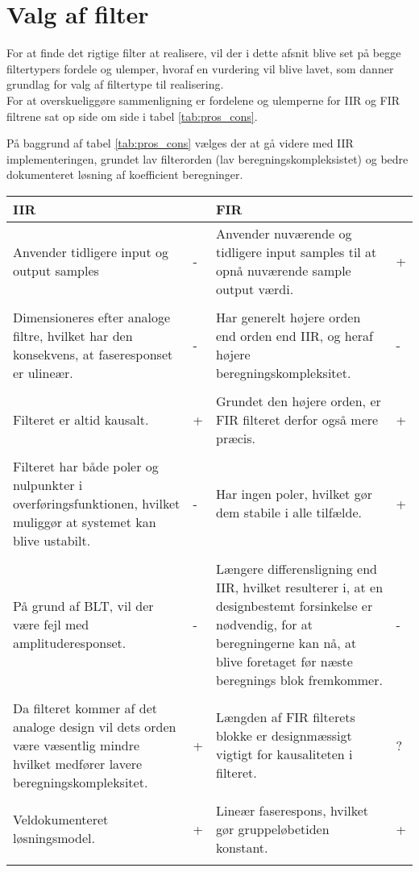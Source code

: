 \section{Valg af filter}\label{sec:dec_filter}
For at finde det rigtige filter at realisere, vil der i dette afsnit blive set på begge filtertypers fordele og ulemper, hvoraf en vurdering vil blive lavet, som danner grundlag for valg af filtertype til realisering. \\
For at overskueliggøre sammenligning er fordelene og ulemperne for IIR og FIR filtrene sat op side om side i tabel \ref{tab:pros_cons}.

På baggrund af tabel \ref{tab:pros_cons} vælges der at gå videre med IIR implementeringen, grundet lav filterorden (lav beregningskompleksistet) og bedre dokumenteret løsning af koefficient beregninger.

\begin{table*}[ht]
\caption{Fordele og ulemper for IIR og FIR}
\centering
\label{tab:pros_cons}
\begin{tabular}{p{0.45\linewidth}p{0.05\linewidth}p{0.45\linewidth}p{0.05\linewidth}}
\toprule
IIR &  &FIR & \\
\midrule 
Anvender tidligere input og output samples & - & Anvender nuværende og tidligere input samples til at opnå nuværende sample output værdi. & + \\
& & & \\
Dimensioneres efter analoge filtre, hvilket har den konsekvens, at faseresponset er ulineær. & - & Har generelt højere orden end orden end IIR, og heraf højere beregningskompleksitet. & - \\ 
& & & \\
Filteret er altid kausalt. & + & Grundet den højere orden, er FIR filteret derfor også mere præcis. & + \\	
& & & \\
Filteret har både poler og nulpunkter i overføringsfunktionen, hvilket muliggør at systemet kan blive ustabilt. & - & Har ingen poler, hvilket gør dem stabile i alle tilfælde. & + \\
& & & \\
På grund af BLT, vil der være fejl med amplituderesponset. & - & Længere differensligning end IIR, hvilket resulterer i, at en designbestemt forsinkelse er nødvendig, for at beregningerne kan nå, at blive foretaget før næste beregnings blok fremkommer. & - \\
& & & \\
Da filteret kommer af det analoge design vil dets orden være væsentlig mindre hvilket medfører lavere beregningskompleksitet. & + & Længden af FIR filterets blokke er designmæssigt vigtigt for kausaliteten i filteret. & ? \\
& & & \\
Veldokumenteret løsningsmodel. & + & Lineær faserespons, hvilket gør gruppeløbetiden konstant. & + \\
& & & \\
\bottomrule	
\end{tabular}
\end{table*}
\FloatBlock



